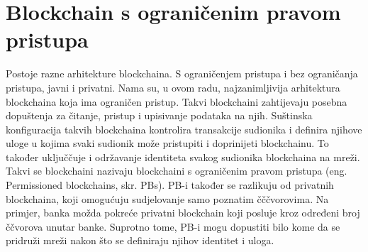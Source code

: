 \documentclass[times, utf8, diplomski]{fer}
\begin{document}
\chapter{Blockchain s ograničenim pravom pristupa}
Postoje razne arhitekture blockchaina. S ograničenjem pristupa i bez ograničanja pristupa, javni i privatni. Nama su, u ovom radu, najzanimljivija arhitektura blockchaina koja ima ograničen pristup. Takvi blockchaini zahtijevaju posebna dopuštenja za čitanje, pristup i upisivanje podataka na njih. Suštinska konfiguracija takvih blockchaina kontrolira transakcije sudionika i definira njihove uloge u kojima svaki sudionik može pristupiti i doprinijeti blockchainu. To također uključčuje i održavanje identiteta svakog sudionika blockchaina na mreži. Takvi se blockchaini nazivaju blockchaini s ograničenim pravom pristupa (eng. Permissioned blockchains, skr. PBs). PB-i također se razlikuju od privatnih blockchaina, koji omogućuju sudjelovanje samo poznatim čččvorovima. Na primjer, banka možda pokreće privatni blockchain koji posluje kroz određeni broj ččvorova unutar banke. Suprotno tome, PB-i mogu dopustiti bilo kome da se pridruži mreži nakon što se definiraju njihov identitet i uloga.
\end{document}
